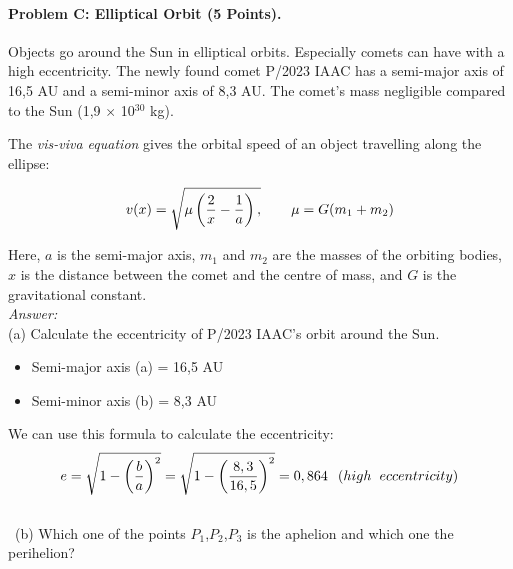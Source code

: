 \documentclass[12pt,times new roman, 2pt, a4paper]{report}
\begin{document}
\paragraph{Problem C: Elliptical Orbit (5 Points).}
Objects go around the Sun in elliptical orbits. Especially comets can have with a high eccentricity. The newly found comet P/2023 IAAC has a semi-major axis of 16,5 AU and a semi-minor axis of 8,3 AU. The comet's mass negligible compared to the Sun (1,9 $\times$ 10$^{30}$ kg).\\
\begin{center}
\end{center}
The \textit{vis-viva equation} gives the orbital speed of an object travelling along the ellipse:
\begin{center}
$$v(x)=\sqrt {\mu \left(\frac {2} {x}- \frac {1} {a}\right),} \hspace{0.3in}\mu=G({m}_{1}+{m}_{2})$$
\end{center}
Here, $a$ is the semi-major axis, ${m}_{1}$ and ${m}_{2}$ are the masses of the orbiting bodies, $x$ is the distance between the comet and the centre of mass, and $G$ is the gravitational constant.\\
\textit{Answer:}\\
(a) Calculate the eccentricity of P/2023 IAAC's orbit around the Sun.\
\begin{itemize}
	\item Semi-major axis (a) = 16,5 AU
	\item Semi-minor axis (b) = 8,3 AU
\end{itemize}
We can use this formula to calculate the eccentricity:\\
$$e = \sqrt{1-\left(\frac {b}{a}\right)^{2}} = \sqrt{1-\left(\frac {8,3}{16,5}\right)^{2}}= 0,864 \hspace{0.1in}(high \hspace{0.08in}eccentricity)$$\\\
(b) Which one of the points ${P}_{1}$,${P}_{2}$,${P}_{3}$ is the aphelion and which one the perihelion?\
\end{document}
